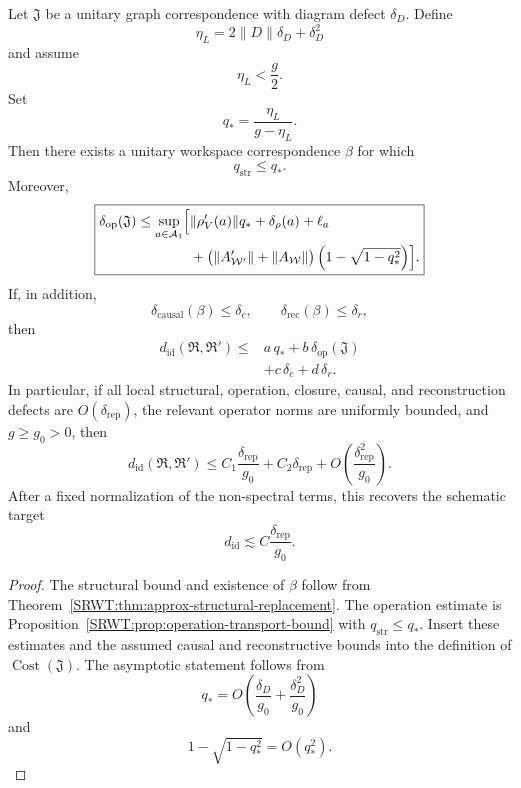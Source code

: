 
\begin{SRWTtheorem}\label{SRWT:thm:replacement-invariance}
Let \(\mathfrak J\) be a unitary graph correspondence with diagram defect
\(\delta_D\). Define
\[
\eta_L=2\|D\|\delta_D+\delta_D^2
\]
and assume
\[
\eta_L<\frac g2.
\]
Set
\[
q_*
=
\frac{\eta_L}{g-\eta_L}.
\]
Then there exists a unitary workspace correspondence \(\beta\) for which
\[
q_{\mathrm{str}}\leq q_*.
\]
Moreover,
\[
\boxed{
\begin{aligned}
\delta_{\mathrm{op}}(\mathfrak J)
\leq
\sup_{a\in\mathcal A_1}
\Bigl[&
\|\rho_V'(a)\|q_*
+\delta_\rho(a)
+\ell_a\\
&+
\bigl(\|A_{\mathcal W'}'\|+\|A_{\mathcal W}\|\bigr)
\left(1-\sqrt{1-q_*^2}\right)
\Bigr].
\end{aligned}
}
\]
If, in addition,
\[
\delta_{\mathrm{causal}}(\beta)\leq\delta_c,
\qquad
\delta_{\mathrm{rec}}(\beta)\leq\delta_r,
\]
then
\[
\boxed{
\begin{aligned}
d_{\mathrm{id}}(\mathfrak R,\mathfrak R')
\leq
&a\,q_*+b\,\delta_{\mathrm{op}}(\mathfrak J)\\
&+c\,\delta_c+d\,\delta_r.
\end{aligned}
}
\]
In particular, if all local structural, operation, closure, causal, and
reconstruction defects are \(O(\delta_{\mathrm{rep}})\), the relevant
operator norms are uniformly bounded, and \(g\geq g_0>0\), then
\[
\boxed{
d_{\mathrm{id}}(\mathfrak R,\mathfrak R')
\leq
C_1\frac{\delta_{\mathrm{rep}}}{g_0}
+C_2\delta_{\mathrm{rep}}
+O\!\left(\frac{\delta_{\mathrm{rep}}^2}{g_0}\right).
}
\]
After a fixed normalization of the non-spectral terms, this recovers the
schematic target
\[
d_{\mathrm{id}}
\lesssim
C\frac{\delta_{\mathrm{rep}}}{g_0}.
\]
\end{SRWTtheorem}

\begin{proof}
The structural bound and existence of \(\beta\) follow from
Theorem~\ref{SRWT:thm:approx-structural-replacement}. The operation estimate is
Proposition~\ref{SRWT:prop:operation-transport-bound} with
\(q_{\mathrm{str}}\leq q_*\). Insert these estimates and the assumed causal
and reconstructive bounds into the definition of
\(\operatorname{Cost}(\mathfrak J)\). The asymptotic statement follows from
\[
q_*=O\!\left(\frac{\delta_D}{g_0}
+\frac{\delta_D^2}{g_0}\right)
\]
and
\[
1-\sqrt{1-q_*^2}=O(q_*^2).
\]
\end{proof}

